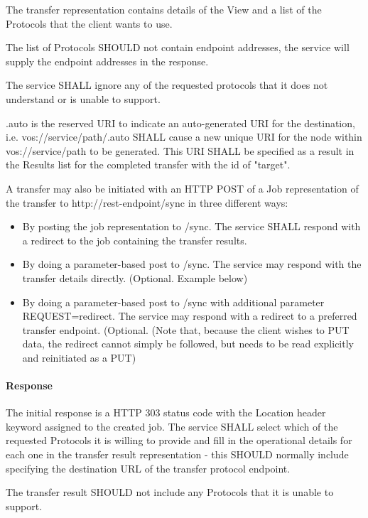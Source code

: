 \documentclass[11pt,a4paper]{ivoa}
\begin{document}
The transfer representation contains details of the View and a list of the Protocols that the client wants to use.

The list of Protocols SHOULD not contain endpoint addresses, the service will supply the endpoint addresses in the response.

The service SHALL ignore any of the requested protocols that it does not understand or is unable to support.

.auto is the reserved URI to indicate an auto-generated URI for the destination, i.e. vos://service/path/.auto SHALL cause a new unique URI for the node within vos://service/path to be generated.  This URI SHALL be specified as a result in the Results list for the completed transfer with the id of "target".

A transfer may also be initiated with an HTTP POST of a Job representation of the transfer to http://rest-endpoint/sync in three different ways:
\begin{itemize}
    \item By posting the job representation to /sync. The service SHALL respond with a redirect to the job containing the transfer results.
    \item By doing a parameter-based post to /sync. The service may respond with the transfer details directly. (Optional. Example below)
    \item By doing a parameter-based post to /sync with additional parameter REQUEST=redirect. The service may respond with a redirect to a preferred transfer endpoint. (Optional. (Note that, because the client wishes to PUT data, the redirect cannot simply be followed, but needs to be read explicitly and reinitiated as a PUT)
\end{itemize}

\paragraph{Response}
The initial response is a HTTP 303 status code with the Location header keyword assigned to the created job.
The service SHALL select which of the requested Protocols it is willing to provide and fill in the operational details for each one in the transfer result representation - this SHOULD normally include specifying the destination URL of the transfer protocol endpoint.

The transfer result SHOULD not include any Protocols that it is unable to support.
\end{document}
